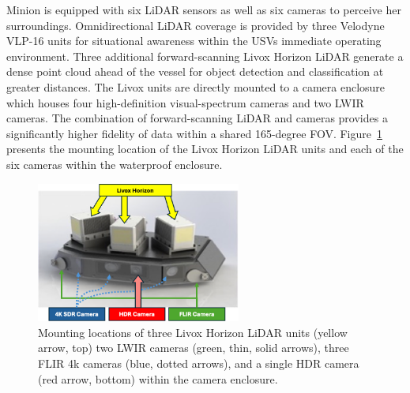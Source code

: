 \documentclass{erauthesis}
\begin{document}
Minion is equipped with six \ac{LiDAR} sensors as well as six cameras to perceive her surroundings.
Omnidirectional \ac{LiDAR} coverage is provided by three Velodyne VLP-16 units for situational awareness within the \acp{USV} immediate operating environment.
Three additional forward-scanning Livox Horizon \ac{LiDAR} generate a dense point cloud ahead of the vessel for object detection and classification at greater distances.
The Livox units are directly mounted to a camera enclosure which houses four high-definition visual-spectrum cameras and two \ac{LWIR} cameras.
The combination of forward-scanning LiDAR and cameras provides a significantly higher fidelity of data within a shared 165-degree \ac{FOV}.%
Figure~\ref{fig:camera_enclosure} presents the mounting location of the Livox Horizon LiDAR units and each of the six cameras within the waterproof enclosure. 

\begin{figure}[htbp]
\centering
\includegraphics[width=0.6\textwidth]{Images/Camera_enclosure2.png}
\caption{Mounting locations of three Livox Horizon LiDAR units (yellow arrow, top) two LWIR cameras (green, thin, solid arrows), three FLIR 4k cameras (blue, dotted arrows), and a single \ac{HDR} camera  (red arrow, bottom) within the camera enclosure.}
\label{fig:camera_enclosure}
\end{figure}

\end{document}
